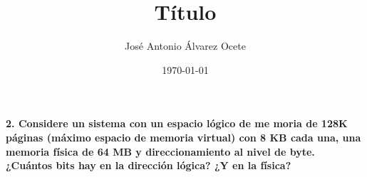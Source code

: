 \documentclass[11pt,a4paper]{article}
\title{Título}
\author{José Antonio Álvarez Ocete}
\date{\today}
\begin{document}
\maketitle


\textbf {
2. Considere  un  sistema  con  un  espacio  lógico  de  me
moria  de  128K  páginas (máximo espacio  de  memoria  virtual) 
con  8  KB  cada  una,  una  memoria  física  de  64  MB  y 
direccionamiento  al  nivel  de  byte.  ¿Cuántos  bits  hay  en  la  dirección  lógica?  ¿Y  en  la física? 
} \\
\end{document}
